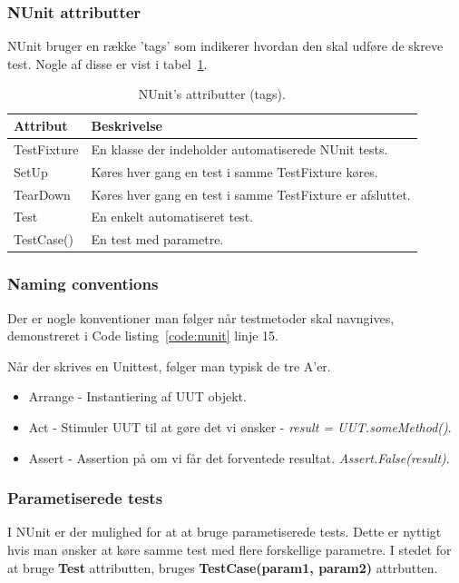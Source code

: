 \subsubsection{NUnit attributter}
NUnit bruger en række 'tags' som indikerer hvordan den skal udføre de skreve test. Nogle af disse er vist i tabel~\ref{tab:nunit}.

\begin{table}[H]
	\centering
	\begin{tabular}{ll}
		\toprule
		\rowcolor{Black!5} \textbf{Attribut}& 	\textbf{Beskrivelse}\\ \midrule
		TestFixture	&	En klasse der indeholder automatiserede NUnit tests. \\
		SetUp		&	Køres hver gang en test i samme TestFixture køres.\\
		TearDown	&	Køres hver gang en test i samme TestFixture er afsluttet.\\
		Test		&	En enkelt automatiseret test.\\
		TestCase()	&	En test med parametre.\\ \bottomrule
	\end{tabular}
	\caption{NUnit's attributter (tags).}
	\label{tab:nunit}
\end{table}

\subsubsection{Naming conventions}
Der er nogle konventioner man følger når testmetoder skal navngives, demonstreret i Code listing~\ref{code:nunit} linje 15.

Når der skrives en Unittest, følger man typisk de tre A'er.

\begin{itemize}
	\item Arrange - Instantiering af UUT objekt.
	\item Act - Stimuler UUT til at gøre det vi ønsker - \textit{result = UUT.someMethod()}.
	\item Assert - Assertion på om vi får det forventede resultat. \textit{Assert.False(result)}.
\end{itemize}

\subsubsection{Parametiserede tests}
I NUnit er der mulighed for at at bruge parametiserede tests. Dette er nyttigt hvis man ønsker at køre samme test med flere forskellige parametre. I stedet for at bruge \textbf{Test} attributten, bruges \textbf{TestCase(param1, param2)} attrbutten.

